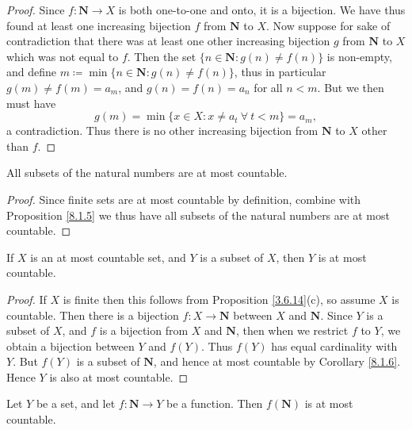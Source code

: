 \begin{proof}
    Since \(f : \mathbf{N} \to X\) is both one-to-one and onto, it is a bijection.
    We have thus found at least one increasing bijection \(f\) from \(\mathbf{N}\) to \(X\).
    Now suppose for sake of contradiction that there was at least one other increasing bijection \(g\) from \(\mathbf{N}\) to \(X\) which was not equal to \(f\).
    Then the set \(\{n \in \mathbf{N} : g(n) \neq f(n)\}\) is non-empty, and define \(m \coloneqq \min\{n \in \mathbf{N} : g(n) \neq f(n)\}\), thus in particular \(g(m) \neq f(m) = a_m\), and \(g(n) = f(n) = a_n\) for all \(n < m\).
    But we then must have
    \[
        g(m) = \min\{x \in X : x \neq a_t \ \forall\ t < m\} = a_m,
    \]
    a contradiction.
    Thus there is no other increasing bijection from \(\mathbf{N}\) to \(X\) other than \(f\).
\end{proof}

\begin{corollary}\label{8.1.6}
    All subsets of the natural numbers are at most countable.
\end{corollary}

\begin{proof}
    Since finite sets are at most countable by definition, combine with Proposition \ref{8.1.5} we thus have all subsets of the natural numbers are at most countable.
\end{proof}

\begin{corollary}\label{8.1.7}
    If \(X\) is an at most countable set, and \(Y\) is a subset of \(X\), then \(Y\) is at most countable.
\end{corollary}

\begin{proof}
    If \(X\) is finite then this follows from Proposition \ref{3.6.14}(c), so assume \(X\) is countable.
    Then there is a bijection \(f : X \to \mathbf{N}\) between \(X\) and \(\mathbf{N}\).
    Since \(Y\) is a subset of \(X\), and \(f\) is a bijection from \(X\) and \(\mathbf{N}\), then when we restrict \(f\) to \(Y\), we obtain a bijection between \(Y\) and \(f(Y)\).
    Thus \(f(Y)\) has equal cardinality with \(Y\).
    But \(f(Y)\) is a subset of \(\mathbf{N}\), and hence at most countable by Corollary \ref{8.1.6}.
    Hence \(Y\) is also at most countable.
\end{proof}

\begin{proposition}\label{8.1.8}
    Let \(Y\) be a set, and let \(f : \mathbf{N} \to Y\) be a function.
    Then \(f(\mathbf{N})\) is at most countable.
\end{proposition}

